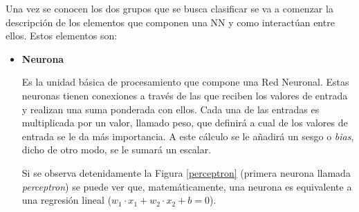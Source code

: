 Una vez se conocen los dos grupos que se busca clasificar se va a comenzar la descripción de los elementos que componen una NN y como interactúan entre ellos. Estos elementos son:

\begin{itemize}
    \item[\tiny{\textbullet}] \textbf{Neurona}
    
    Es la unidad básica de procesamiento que compone una Red Neuronal. Estas neuronas tienen conexiones a través de las que reciben los valores de entrada y realizan una suma ponderada con ellos. Cada una de las entradas es multiplicada por un valor, llamado peso, que definirá a cual de los valores de entrada se le da más importancia. A este cálculo se le añadirá un sesgo o \textit{bias}, dicho de otro modo, se le sumará un escalar.
    
    Si se observa detenidamente la Figura \ref{perceptron} (primera neurona llamada \textit{perceptron}) se puede ver que, matemáticamente, una neurona es equivalente a una regresión lineal ($w_1 \cdot x_1 + w_2 \cdot x_2 + b = 0$).
    
    \begin{figure}[H]
        \centering
\end{figure}
\end{itemize}
